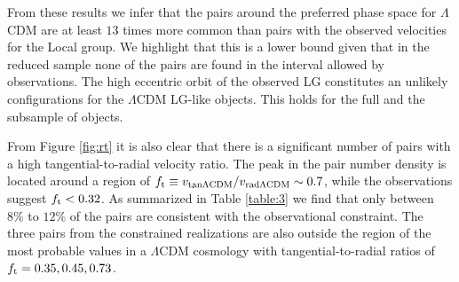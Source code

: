 \documentclass{emulateapj}
\begin{document}
From these results we infer that the pairs around the preferred phase
space for $\Lambda$CDM are at least $13$ times more common than pairs
with the observed velocities for the Local group. We highlight that
this is a lower bound given that in the reduced sample none of the
pairs are found in the interval allowed by observations. The high
eccentric orbit of the observed LG  constitutes an unlikely
configurations for the $\Lambda$CDM LG-like objects. This holds for
the full and the subsample of objects. 


From Figure \ref{fig:rt} it is also clear that there is a significant
number of pairs with a high tangential-to-radial velocity ratio. The
peak in the pair number density is located around a region of $f_{\rm
  t}\equiv v_{\rm tan \Lambda CDM}/v_{\rm rad \Lambda CDM}\sim 0.7$,
while the observations suggest $f_{\rm t}<0.32$. As summarized in Table
\ref{table:3} we find that only between $8\%$ to $12\%$ of the pairs are
consistent with the observational constraint. The three
pairs from the constrained realizations are also outside the region of
the most probable values in a $\Lambda$CDM cosmology with
tangential-to-radial ratios of $f_{\rm t}= 0.35, 0.45, 0.73$. 
\end{document}
